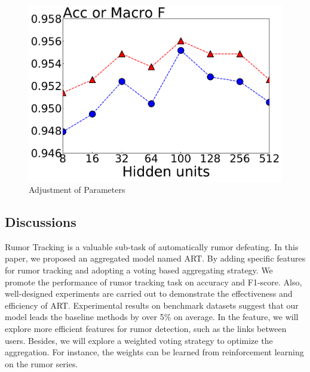 \begin{figure}[htbp]
{\begin{minipage}[b]{0.35\linewidth}
			\includegraphics[width=1\linewidth]{fig/hidden_units}
		\end{minipage}
	}
	\caption{Adjustment of Parameters}
	\label{fig:parameter}
\end{figure}


\subsection{Discussions}
Rumor Tracking is a valuable sub-task of automatically rumor defeating. In this paper, we proposed an aggregated model named ART.  By adding specific features for rumor tracking and adopting a voting based aggregating strategy. We promote the performance of rumor tracking task on accuracy and F1-score. Also, well-designed experiments are carried out to demonstrate the effectiveness and efficiency of ART. Experimental results on benchmark datasets suggest that our model leads the baseline methods by over 5\% on average. In the feature, we will explore more efficient features for rumor detection, such as the links between users. Besides, we will explore a weighted voting strategy to optimize the aggregation. For instance, the weights can be learned from reinforcement learning on the rumor series.

